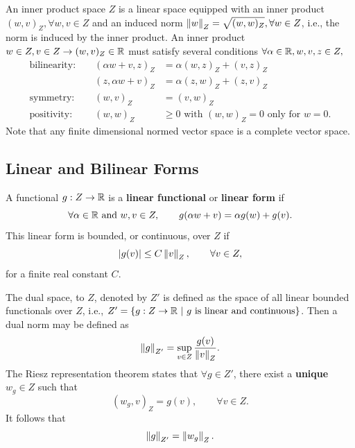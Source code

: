 An inner product space $Z$ is a linear space equipped with an inner product $(w,v)_Z, \forall w,v \in Z$ and an induced norm $\left\lVert w \right\rVert_{Z}=\sqrt{(w,w)_Z}, \forall w \in Z$, i.e., the norm is induced by the inner product. An inner product $w\in Z, v\in Z \rightarrow (w,v)_Z \in {\mathbb{ R}}$ must satisfy several conditions $\forall \alpha \in {\mathbb{ R}}, w,v,z \in Z,$
\begin{align}
	\text{bilinearity: } &  & (\alpha w +v,z)_Z & = \alpha (w,z)_Z + (v,z)_Z \nonumber                              \\
	                     &  & (z,\alpha w +v)_Z & = \alpha (z,w)_Z + (z,v)_Z \nonumber                              \\
	\text{symmetry: }    &  & (w,v)_Z           & = (v,w)_Z                                                         \\
	\text{positivity: }  &  & (w,w)_Z           & \geq 0 \text{ with } (w,w)_Z = 0 \text{ only for } w=0. \nonumber
\end{align}
Note that any finite dimensional normed vector space is a complete vector space.

\subsection{Linear and Bilinear Forms}
A functional $g: Z \rightarrow {\mathbb{ R}}$ is a \textbf{linear functional} or \textbf{linear form} if
\begin{equation}
	\forall \alpha \in {\mathbb{ R}} \text{ and } w,v \in Z,\qquad g(\alpha w + v ) = \alpha g(w) + g(v).
\end{equation}
This linear form is bounded, or continuous, over $Z$ if
\begin{equation}
	|g(v)| \leq C \left\lVert v \right\rVert_{Z}, \qquad \forall v \in Z,
\end{equation}
for a finite real constant $C$.

The dual space, to $Z$, denoted by $Z'$ is defined as the space of all linear bounded functionals over $Z$, i.e., $Z'=\{g:Z \rightarrow {\mathbb{ R}} \ | \ g \text{ is linear and continuous}\}$. Then a dual norm may be defined as
\begin{equation}
	\left\lVert g \right\rVert_{Z'} = \sup_{v\in Z} \frac{g(v)}{\left\lVert v \right\rVert_{Z}}.
\end{equation}
The Riesz representation theorem states that $\forall g \in Z'$, there exist a \textbf{unique} $w_g \in Z$ such that
\begin{equation}
	(w_g,v)_Z = g(v), \qquad \forall v \in Z.
\end{equation}
It follows that
\begin{equation}
	\left\lVert g \right\rVert_{Z'} = \left\lVert w_g \right\rVert_{Z}.
\end{equation}

